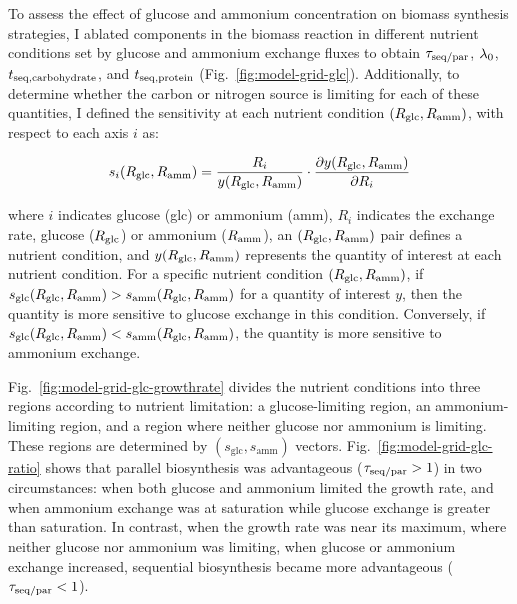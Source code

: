 To assess the effect of glucose and ammonium concentration on biomass synthesis strategies, I ablated components in the biomass reaction in different nutrient conditions set by glucose and ammonium exchange fluxes
to obtain $\tau_{\mathrm{seq}/\mathrm{par}}$, $\lambda_{0}$, $t_{\mathrm{seq},\mathrm{carbohydrate}}$, and $t_{\mathrm{seq},\mathrm{protein}}$ (Fig.\ \ref{fig:model-grid-glc}).
Additionally, to determine whether the carbon or nitrogen source is limiting for each of these quantities, I defined the sensitivity at each nutrient condition $(R_{\mathrm{glc}}, R_{\mathrm{amm}})$, with respect to each axis $i$ as:

\begin{equation}
  s_{i}(R_{\mathrm{glc}}, R_{\mathrm{amm}}) = \frac{R_{i}}{y(R_{\mathrm{glc}}, R_{\mathrm{amm}})} \cdot \frac{\partial y(R_{\mathrm{glc}}, R_{\mathrm{amm}})}{\partial R_{i}}
  \label{eq:model-susceptibility}
\end{equation}

where
$i$ indicates glucose (glc) or ammonium (amm),
$R_{i}$ indicates the exchange rate, glucose ($R_{\mathrm{glc}}$) or ammonium ($R_{\mathrm{amm}}$),
an $(R_{\mathrm{glc}}, R_{\mathrm{amm}})$ pair defines a nutrient condition, and
$y(R_{\mathrm{glc}}, R_{\mathrm{amm}})$ represents the quantity of interest at each nutrient condition.
For a specific nutrient condition $(R_{\mathrm{glc}}, R_{\mathrm{amm}})$, if $s_{\mathrm{glc}}(R_{\mathrm{glc}}, R_{\mathrm{amm}}) > s_{\mathrm{amm}}(R_{\mathrm{glc}}, R_{\mathrm{amm}})$ for a quantity of interest $y$, then the quantity is more sensitive to glucose exchange in this condition.
Conversely, if $s_{\mathrm{glc}}(R_{\mathrm{glc}}, R_{\mathrm{amm}}) < s_{\mathrm{amm}}(R_{\mathrm{glc}}, R_{\mathrm{amm}})$, the quantity is more sensitive to ammonium exchange.

Fig.\ \ref{fig:model-grid-glc-growthrate} divides the nutrient conditions into three regions according to nutrient limitation: a glucose-limiting region, an ammonium-limiting region, and a region where neither glucose nor ammonium is limiting.
These regions are determined by $(s_{\mathrm{glc}}, s_{\mathrm{amm}})$ vectors.
Fig.\ \ref{fig:model-grid-glc-ratio} shows that parallel biosynthesis was advantageous ($\tau_{\mathrm{seq}/\mathrm{par}} > 1$) in two circumstances: when both glucose and ammonium limited the growth rate, and when ammonium exchange was at saturation while glucose exchange is greater than saturation.
In contrast, when the growth rate was near its maximum, where neither glucose nor ammonium was limiting, when glucose or ammonium exchange increased, sequential biosynthesis became more advantageous ($\tau_{\mathrm{seq}/\mathrm{par}} < 1$).

